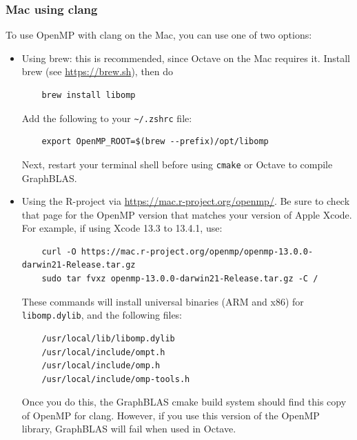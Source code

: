 \subsubsection{Mac using clang}
\label{mac_openmp}

To use OpenMP with clang on the Mac, you can use one of two options:

\begin{itemize}
\item Using brew: this is recommended, since Octave on the Mac requires it.
    Install brew (see \url{https://brew.sh}), then do

    {\scriptsize
    \begin{verbatim}
    brew install libomp
    \end{verbatim} }

\noindent
Add the following to your \verb'~/.zshrc' file:

    {\scriptsize
    \begin{verbatim}
    export OpenMP_ROOT=$(brew --prefix)/opt/libomp
    \end{verbatim} }

\noindent
Next, restart your terminal shell before using \verb'cmake' or Octave to
compile GraphBLAS.

\item Using the R-project via
    \url{https://mac.r-project.org/openmp/}.
Be sure to check that page for the OpenMP version
that matches your version of Apple Xcode.
For example, if using Xcode 13.3 to 13.4.1, use:

    {\scriptsize
    \begin{verbatim}
    curl -O https://mac.r-project.org/openmp/openmp-13.0.0-darwin21-Release.tar.gz
    sudo tar fvxz openmp-13.0.0-darwin21-Release.tar.gz -C /
    \end{verbatim} }

\noindent
These commands will install universal binaries (ARM and x86) for
\verb'libomp.dylib', and the following files:

    {\scriptsize
    \begin{verbatim}
    /usr/local/lib/libomp.dylib
    /usr/local/include/ompt.h
    /usr/local/include/omp.h
    /usr/local/include/omp-tools.h
    \end{verbatim} }

\noindent
Once you do this, the GraphBLAS cmake build system should find this copy of
OpenMP for clang.  However, if you use this version of the OpenMP library,
GraphBLAS will fail when used in Octave.

\end{itemize}

